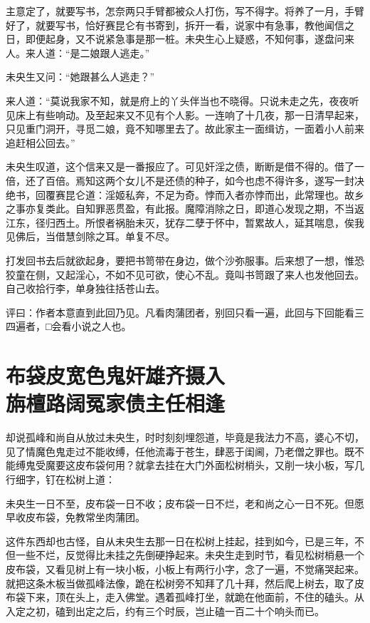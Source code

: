 \documentclass[a4paper,12pt,UTF8,twoside]{ctexbook}
\begin{document}
主意定了，就要写书，怎奈两只手臂都被众人打伤，写不得字。将养了一月，手臂好了，就要写书，恰好赛昆仑有书寄到，拆开一看，说家中有急事，教他闻信之日，即便起身，又不说紧急事是那一桩。未央生心上疑惑，不知何事，遂盘问来人。来人道：“是二娘跟人逃走。”

未央生又问：“她跟甚么人逃走？”

来人道：“莫说我家不知，就是府上的丫头伴当也不晓得。只说未走之先，夜夜听见床上有些响动。及至起来又不见有个人影。一连响了十几夜，那一日清早起来，只见重门洞开，寻觅二娘，竟不知哪里去了。故此家主一面缉访，一面着小人前来追赶相公回去。”

未央生叹道，这个信来又是一番报应了。可见奸淫之债，断断是借不得的。借了一倍，还了百倍。焉知这两个女儿不是还债的种子，如今也虑不得许多，遂写一封决绝书，回覆赛昆仑道：淫姬私奔，不足为奇。悖而入者亦悖而出，此常理也。故乡之事亦复类此。自知罪恶贯盈，有此报。魔障消除之日，即道心发现之期，不当返江东，径归西土。所恨者祸胎未灭，犹存二孽于怀中，暂累故人，延其喘息，俟我见佛后，当借慧剑除之耳。单复不尽。

打发回书去后就欲起身，要把书笥带在身边，做个沙弥服事。后来想了一想，惟恐狡童在侧，又起淫心，不如不见可欲，使心不乱。竟叫书笥跟了来人也发他回去。自己收拾行李，单身独往括苍山去。

评曰：作者本意直到此回乃见。凡看肉蒲团者，别回只看一遍，此回与下回能看三四遍者，□会看小说之人也。

\chapter[布袋皮宽色鬼奸雄齐摄入\ 旃檀路阔冤家债主任相逢]{布袋皮宽色鬼奸雄齐摄入\\旃檀路阔冤家债主任相逢}

却说孤峰和尚自从放过未央生，时时刻刻埋怨道，毕竟是我法力不高，婆心不切，见了情魔色鬼走过不能收缚，任他流毒于苍生，肆恶于闺阃，乃老僧之罪也。既不能缚鬼受魔要这皮布袋何用？就拿去挂在大门外面松树梢头，又削一块小板，写几行细字，钉在松树上道：

未央生一日不至，皮布袋一日不收；皮布袋一日不烂，老和尚之心一日不死。但愿早收皮布袋，免教常坐肉蒲团。

这件东西却也古怪，自从未央生去那一日在松树上挂起，挂到如今，已是三年，不但一些不烂，反觉得比未挂之先倒硬挣起来。未央生走到时节，看见松树梢悬一个皮布袋，又看见树上有一块小板，小板上有两行小字，念了一遍，不觉痛哭起来。就把这条木板当做孤峰法像，跪在松树旁不知拜了几十拜，然后爬上树去，取了皮布袋下来，顶在头上，走入佛堂。遇着孤峰打坐，就跪在他面前，不住的磕头。从入定之初，磕到出定之后，约有三个时辰，岂止磕一百二十个响头而已。
\end{document}
